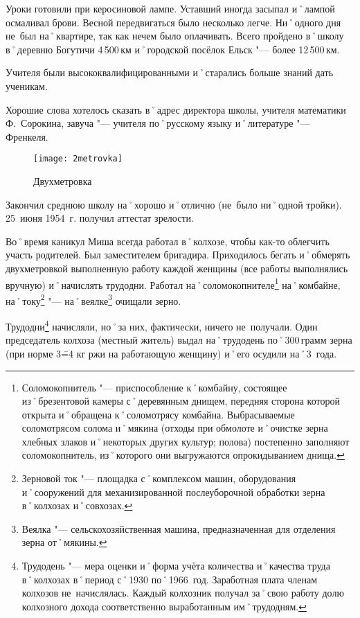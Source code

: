 Уроки готовили при керосиновой лампе. Уставший иногда засыпал и˚лампой осмаливал брови. Весной передвигаться было несколько легче. Ни˚одного дня не~был на˚квартире, так как нечем было оплачивать. Всего пройдено в˚школу в˚деревню Богутичи 4\,500\,км и˚городской посёлок Ельск "--- более 12\,500\,км. 

Учителя были высококвалифицированными и˚старались больше знаний дать ученикам.

Хорошие слова хотелось сказать в˚адрес директора школы, учителя математики Ф.~Сорокина, завуча "--- учителя по˚русскому языку и˚литературе "--- Френкеля. 

\begin{wrapfigure}{O}{.25\textwidth}
\centering
\texttt{[image: 2metrovka]}
\caption[Двухметровка]{Двухметровка\footnotemark}
\label{fig:2metrovka}
\end{wrapfigure}

Закончил среднюю школу на˚хорошо и˚отлично (не~было ни˚одной тройки). 25~июня 1954~г. получил аттестат зрелости.

Во˚время каникул Миша всегда работал в˚колхозе, чтобы как-то облегчить участь родителей. Был заместителем бригадира. Приходилось бегать и˚обмерять двухметровкой выполненную работу каждой женщины (все работы выполнялись вручную) и˚начислять трудодни. Работал на˚соломокопнителе\footnote{Соломокопнитель "--- приспособление к˚комбайну, состоящее из˚брезентовой камеры с˚деревянным днищем, передняя сторона которой открыта и˚обращена к˚соломотрясу комбайна. Выбрасываемые соломотрясом солома и˚мякина (отходы при обмолоте и˚очистке зерна хлебных злаков и˚некоторых других культур; полова) постепенно заполняют соломокопнитель, из˚которого они выгружаются опрокидыванием днища.} на˚комбайне, на˚току\footnote{Зерновой ток "--- площадка с˚комплексом машин, оборудования и˚сооружений для механизированной послеуборочной обработки зерна в˚колхозах и˚совхозах.} "--- на˚веялке\footnote{Веялка "--- сельскохозяйственная машина, предназначенная для отделения зерна от˚мякины.} очищали зерно.

Трудодни\footnote{Трудодень "--- мера оценки и˚форма учёта количества и˚качества труда в˚колхозах в˚период с˚1930 по˚1966~год. Заработная плата членам колхозов не~начислялась. Каждый колхозник получал за˚свою работу долю колхозного дохода соответственно выработанным им˚трудодням.} начисляли, но˚за них, фактически, ничего не~получали. Один председатель колхоза (местный житель) выдал на˚трудодень по˚300\,грамм зерна (при норме 3\==4 кг ржи на работающую женщину) и˚его осудили на˚3~года.


